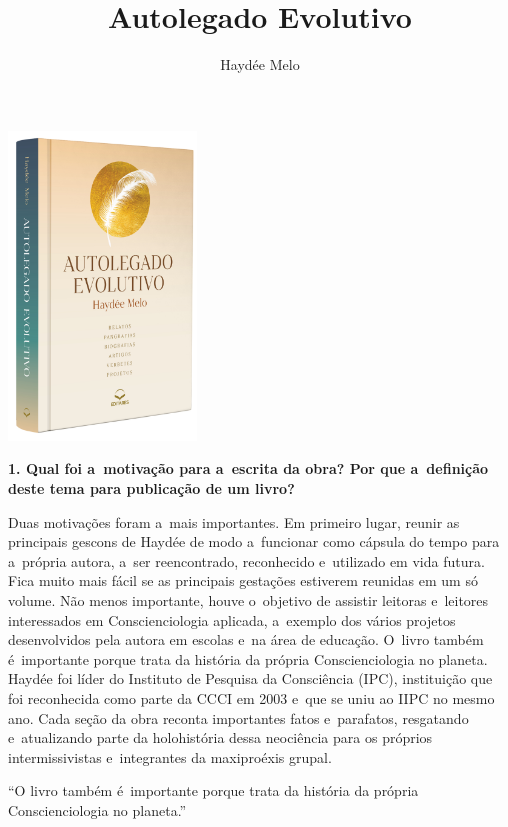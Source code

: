 \documentclass{gescons}
\author{Haydée Melo}
\title{Autolegado Evolutivo}
\begin{document}
    \makeentrevistatitle

    \begin{multicols}{3}

\begin{center}
    \includegraphics[width=5cm]{articles/entrevista/mockups/Haydee_Melo}
\end{center}


\textbf{1. Qual foi a~motivação para a~escrita da obra? Por que a~definição deste tema para publicação de um livro?}


Duas motivações foram a~mais importantes. Em primeiro lugar, reunir as principais gescons de Haydée de modo a~funcionar como cápsula do tempo para a~própria autora, a~ser reencontrado, reconhecido e~utilizado em vida futura. Fica muito mais fácil se as principais gestações estiverem reunidas em um só volume. Não menos importante, houve o~objetivo de assistir leitoras e~leitores interessados em Conscienciologia aplicada, a~exemplo dos vários projetos desenvolvidos pela autora em escolas e~na área de educação. O~livro também é~importante porque trata da história da própria Conscienciologia no planeta. Haydée foi líder do Instituto de Pesquisa da Consciência (IPC), instituição que foi reconhecida como parte da CCCI em 2003 e~que se uniu ao IIPC no mesmo ano. Cada seção da obra reconta importantes fatos e~parafatos, resgatando e~atualizando parte da holohistória dessa neociência para os próprios intermissivistas e~integrantes da maxiproéxis grupal.

\begin{pullquote}
``O livro também é~importante porque trata da história da própria Conscienciologia no planeta.''
\end{pullquote}


\end{multicols}
\end{document}

